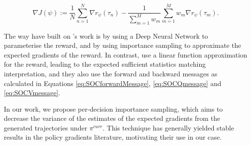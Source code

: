 \documentclass{report}
\numberwithin{equation}{section}
\numberwithin{figure}{section}
\numberwithin{table}{section}
\numberwithin{algorithm}{section}
\begin{document}
\begin{equation}\label{eq:irlEpisodicImpSampledObj}
  \nabla J(\psi):=\frac{1}{N} \sum_{n=1}^N \nabla r_\psi(\tau_n)
  - \frac{1}{\sum_{m=1}^M w_m}\sum_{m=1}^M w_m\nabla r_\psi(\tau_m).
\end{equation}

The way \cite{FinnGCL} have built on \cite{Ziebart2008}'s work is 
by using a Deep Neural Network to parameterise the reward, and 
by using importance sampling to approximate the expected 
gradients of the reward. In contrast, \cite{Ziebart2008} use 
a linear function approximation for the reward, leading to the 
expected sufficient statistics matching interpretation, and 
they also use the forward and backward messages as calculated 
in Equations \ref{eq:SOCforwardMessage}, \ref{eq:SOCQmessage} 
and \ref{eq:SOCVmessage}.

In our work, we propose per-decision importance sampling, which 
aims to decrease the variance of the estimates of the expected 
gradients from the generated trajectories under $\pi^{curr}$. 
This technique has generally yielded stable results in the 
policy gradients literature, motivating their use in our case.

\end{document}

